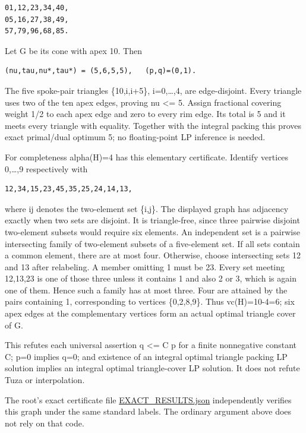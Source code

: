 \documentclass[11pt]{article}
\begin{document}
\begin{verbatim}
01,12,23,34,40,
05,16,27,38,49,
57,79,96,68,85.
\end{verbatim}

Let G be its cone with apex 10. Then

\begin{verbatim}
(nu,tau,nu*,tau*) = (5,6,5,5),   (p,q)=(0,1).
\end{verbatim}

The five spoke-pair triangles \{10,i,i+5\}, i=0,\ldots,4, are edge-disjoint. Every triangle uses two of the ten apex edges, proving nu \textless= 5. Assign fractional covering weight 1/2 to each apex edge and zero to every rim edge. Its total is 5 and it meets every triangle with equality. Together with the integral packing this proves exact primal/dual optimum 5; no floating-point LP inference is needed.

For completeness alpha(H)=4 has this elementary certificate. Identify vertices 0,\ldots,9 respectively with

\begin{verbatim}
12,34,15,23,45,35,25,24,14,13,
\end{verbatim}

where ij denotes the two-element set \{i,j\}. The displayed graph has adjacency exactly when two sets are disjoint. It is triangle-free, since three pairwise disjoint two-element subsets would require six elements. An independent set is a pairwise intersecting family of two-element subsets of a five-element set. If all sets contain a common element, there are at most four. Otherwise, choose intersecting sets 12 and 13 after relabeling. A member omitting 1 must be 23. Every set meeting 12,13,23 is one of those three unless it contains 1 and also 2 or 3, which is again one of them. Hence such a family has at most three. Four are attained by the pairs containing 1, corresponding to vertices \{0,2,8,9\}. Thus vc(H)=10-4=6; six apex edges at the complementary vertices form an actual optimal triangle cover of G.

This refutes each universal assertion q \textless= C p for a finite nonnegative constant C; p=0 implies q=0; and existence of an integral optimal triangle packing LP solution implies an integral optimal triangle-cover LP solution. It does not refute Tuza or interpolation.

The root's exact certificate file \href{https://github.com/pappa211/ai-math-experiments/blob/main/problems/TUZA-09/certificates/EXACT_RESULTS.json}{EXACT\_RESULTS.json} independently verifies this graph under the same standard labels. The ordinary argument above does not rely on that code.
\end{document}
